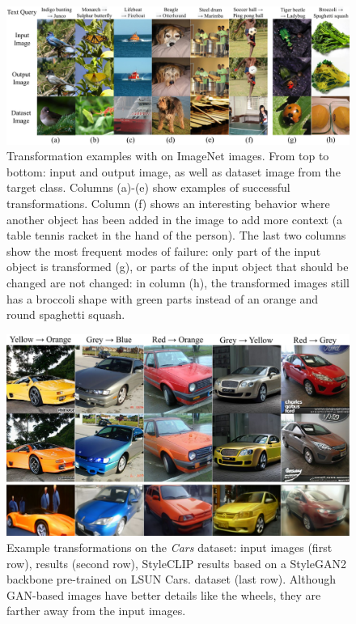 \begin{figure}
    \centering
    \includegraphics[width=\linewidth]{images/flexit/assets/main_exs.pdf}
    \caption{Transformation examples with \ours on ImageNet images. 
    From top to bottom: input and output image, as well as dataset image from the target
     class.
    Columns (a)-(e) show examples of successful transformations. Column (f) shows an
     interesting behavior where another object has been added in the image to add more 
     context (a table tennis racket in the hand of the person). The  last two columns 
      show the most frequent modes of failure: only part of the input object is
       transformed (g), or parts of the input object that should be changed are not 
       changed: in column (h), the transformed images still has a broccoli shape with 
       green parts instead of an orange and round spaghetti squash.
    }
\label{fig:visuresu}
\end{figure}


\begin{figure}
    \centering
    \vspace{-1em}
    \includegraphics[width=\linewidth]{images/flexit/assets/cars2.pdf}
    \caption{Example  transformations on the \textit{Cars} dataset:  input images (first row),  \ours results  (second row), StyleCLIP results based on a  StyleGAN2 backbone pre-trained on LSUN Cars.
    dataset (last row). Although GAN-based images have better details like the wheels, they are farther away from the input images.}
    
    \label{fig:cars30k}
\end{figure}

